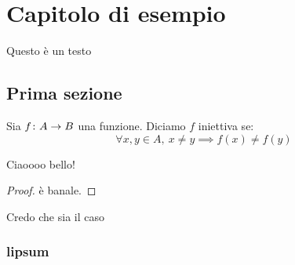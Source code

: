 \chapter{Capitolo di esempio}
Questo è un testo
\section{Prima sezione}
\begin{definition}
    Sia $f\colon A\rightarrow B$ una funzione. Diciamo $f$ iniettiva se: $$\forall x,y\in A,\ x\neq y\implies f(x) \neq f(y)$$
\end{definition}
\begin{theorem} Ciaoooo bello!
\end{theorem}
\begin{proof}
    è banale.
\end{proof}
\begin{corollary} Credo che sia il caso
\end{corollary}
\lipsum \lipsum
\subsection{lipsum}
\lipsum[5-7]